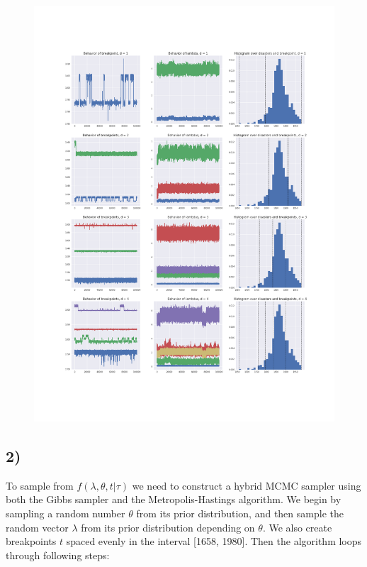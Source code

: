 \documentclass[a4paper]{article}
\begin{document}
\begin{figure}[H]
    \centering
    \includegraphics[width = 1.0\textwidth]{images/chain_behavior.png} 
    \caption{}
    \label{}
\end{figure}

\subsection*{2)}

To sample from $f(\lambda, \theta, t | \tau)$ we need to construct a hybrid MCMC sampler using both the Gibbs sampler and the Metropolis-Hastings algorithm. We begin by sampling a random number $\theta$ from its prior distribution, and then sample the random vector \textbf{$\lambda$} from its prior distribution depending on $\theta$. We also create breakpoints $t$ spaced evenly in the interval [1658, 1980]. Then the algorithm loops through following steps:
\end{document}
